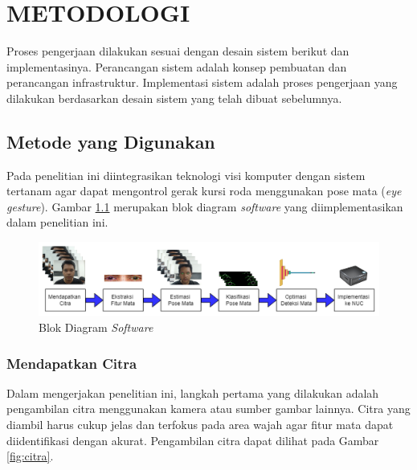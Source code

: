 \chapter{METODOLOGI}
\label{chap:metodologi}


Proses pengerjaan dilakukan sesuai dengan desain sistem berikut dan implementasinya. Perancangan sistem adalah konsep pembuatan dan perancangan infrastruktur. Implementasi sistem adalah proses pengerjaan yang dilakukan berdasarkan desain sistem yang telah dibuat sebelumnya.

\section{Metode yang Digunakan}
\label{sec:deskripsisistem}
Pada penelitian ini diintegrasikan teknologi visi komputer dengan sistem tertanam agar dapat mengontrol gerak kursi roda menggunakan pose mata (\emph{eye gesture}). Gambar \ref{fig:software} merupakan blok diagram \emph{software} yang diimplementasikan dalam penelitian ini.

\begin{figure} [H] \centering
  \includegraphics[width=\textwidth]{gambar/bab3/metod.png}
  \caption{Blok Diagram \textit{Software}}
  \label{fig:software}
\end{figure}

\subsection{Mendapatkan Citra}

Dalam mengerjakan penelitian ini, langkah pertama yang dilakukan adalah pengambilan citra menggunakan kamera atau sumber gambar lainnya. Citra yang diambil harus cukup jelas dan terfokus pada area wajah agar fitur mata dapat diidentifikasi dengan akurat. Pengambilan citra dapat dilihat pada Gambar \ref{fig:citra}.\\

